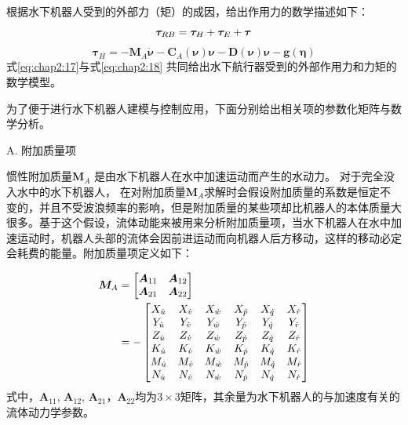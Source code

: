 根据水下机器人受到的外部力（矩）的成因，给出作用力的数学描述如下：
\begin{equation}
\centering
\label{eq:chap2:17}
\bm{\tau}_{RB} = \bm{\tau}_{H} + \bm{\tau}_E +  \bm{\tau}
\end{equation}
\begin{equation}
\label{eq:chap2:18}
\bm{\tau}_{H} = -{\bm{M}_A}{\bm{\dot \nu}} - {\bm{C}_A}(\bm{\nu}) {\bm{\nu}} - \bm{D}(\bm{\nu})\bm{\nu}-\bm{g}({\bm{\eta}})
\end{equation}
式\ref{eq:chap2:17}与式\ref{eq:chap2:18} 共同给出水下航行器受到的外部作用力和力矩的数学模型。

为了便于进行水下机器人建模与控制应用，下面分别给出相关项的参数化矩阵与数学分析。

A. 附加质量项

惯性附加质量$\bm{M}_A$ 是由水下机器人在水中加速运动而产生的水动力。 对于完全没入水中的水下机器人， 在对附加质量$\bm{M}_A $求解时会假设附加质量的系数是恒定不变的，并且不受波浪频率的影响，但是附加质量的某些项却比机器人的本体质量大很多。基于这个假设，流体动能来被用来分析附加质量项，当水下机器人在水中加速运动时，机器人头部的流体会因前进运动而向机器人后方移动，这样的移动必定会耗费的能量。附加质量项定义如下：

\begin{equation}
\centering
\label{eq:chap2:19}
\begin{aligned}
\bm{M}_{A}  &= \begin{bmatrix}
                 \bm{A}_{11}   &  \bm{A}_{12}   \\
                 \bm{A}_{21}   &  \bm{A}_{22}   \\
               \end{bmatrix}                    \\
            &=-\begin{bmatrix}
 X_{\dot u} &  X_{\dot v} &  X_{\dot w} &  X_{\dot p} &  X_{\dot q} &  X_{\dot r} \\
 Y_{\dot u} &  Y_{\dot v} &  Y_{\dot w} &  Y_{\dot p} &  Y_{\dot q} &  Y_{\dot r} \\
 Z_{\dot u} &  Z_{\dot v} &  Z_{\dot w} &  Z_{\dot p} &  Z_{\dot q} &  Z_{\dot r} \\
 K_{\dot u} &  K_{\dot v} &  K_{\dot w} &  K_{\dot p} &  K_{\dot q} &  K_{\dot r} \\
 M_{\dot u} &  M_{\dot v} &  M_{\dot w} &  M_{\dot p} &  M_{\dot q} &  M_{\dot r} \\
 N_{\dot u} &  N_{\dot v} &  N_{\dot w} &  N_{\dot p} &  N_{\dot q} &  N_{\dot r} \\
              \end{bmatrix}
\end{aligned}
\end{equation}
式中，$\bm{A}_{11}$, $ \bm{A}_{12}$, $\bm{A}_{21}$，$\bm{A}_{22}$均为$3 \times 3$矩阵，其余量为水下机器人的与加速度有关的流体动力学参数。


